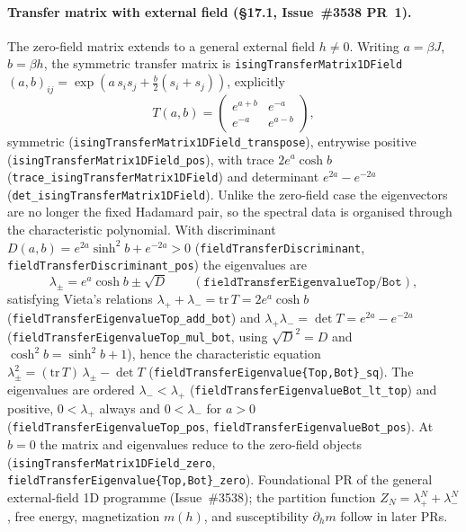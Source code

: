 \documentclass[a4paper,11pt]{article}
\begin{document}
\paragraph{Transfer matrix with external field (\S17.1, Issue~\#3538 PR~1).}
The zero-field matrix extends to a general external field $h \ne 0$. Writing
$a = \beta J$, $b = \beta h$, the symmetric transfer matrix is
\texttt{isingTransferMatrix1DField}$(a,b)_{ij} =
\exp(a\,s_i s_j + \tfrac{b}{2}(s_i + s_j))$, explicitly
\[
  T(a,b) = \begin{pmatrix} e^{a+b} & e^{-a} \\ e^{-a} & e^{a-b} \end{pmatrix},
\]
symmetric (\texttt{isingTransferMatrix1DField\_transpose}), entrywise positive
(\texttt{isingTransferMatrix1DField\_pos}), with trace $2e^a\cosh b$
(\texttt{trace\_isingTransferMatrix1DField}) and determinant $e^{2a} - e^{-2a}$
(\texttt{det\_isingTransferMatrix1DField}). Unlike the zero-field case the
eigenvectors are no longer the fixed Hadamard pair, so the spectral data is
organised through the characteristic polynomial. With discriminant
$D(a,b) = e^{2a}\sinh^2 b + e^{-2a} > 0$
(\texttt{fieldTransferDiscriminant}, \texttt{fieldTransferDiscriminant\_pos}) the
eigenvalues are
\[
  \lambda_\pm = e^a\cosh b \pm \sqrt{D}
  \qquad (\texttt{fieldTransferEigenvalueTop} / \texttt{Bot}),
\]
satisfying Vieta's relations $\lambda_+ + \lambda_- = \mathrm{tr}\,T = 2e^a\cosh b$
(\texttt{fieldTransferEigenvalueTop\_add\_bot}) and $\lambda_+\lambda_- = \det T
= e^{2a} - e^{-2a}$ (\texttt{fieldTransferEigenvalueTop\_mul\_bot}, using
$\sqrt{D}^2 = D$ and $\cosh^2 b = \sinh^2 b + 1$), hence the characteristic
equation $\lambda_\pm^2 = (\mathrm{tr}\,T)\,\lambda_\pm - \det T$
(\texttt{fieldTransferEigenvalue\{Top,Bot\}\_sq}). The eigenvalues are ordered
$\lambda_- < \lambda_+$ (\texttt{fieldTransferEigenvalueBot\_lt\_top}) and
positive, $0 < \lambda_+$ always and $0 < \lambda_-$ for $a > 0$
(\texttt{fieldTransferEigenvalueTop\_pos},
\texttt{fieldTransferEigenvalueBot\_pos}). At $b = 0$ the matrix and eigenvalues
reduce to the zero-field objects (\texttt{isingTransferMatrix1DField\_zero},
\texttt{fieldTransferEigenvalue\{Top,Bot\}\_zero}). Foundational PR of the
general external-field 1D programme (Issue~\#3538); the partition function
$Z_N = \lambda_+^N + \lambda_-^N$, free energy, magnetization $m(h)$, and
susceptibility $\partial_h m$ follow in later PRs.
\end{document}
